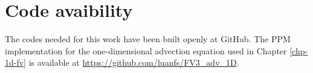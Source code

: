 \chapter{Code avaibility}
\label{anexo-code}

The codes needed for this work have been built openly at GitHub. 
The PPM implementation for the one-dimensional advection equation used in Chapter 
\ref{chp-1d-fv} is available at \url{https://github.com/luanfs/FV3_adv_1D}.

